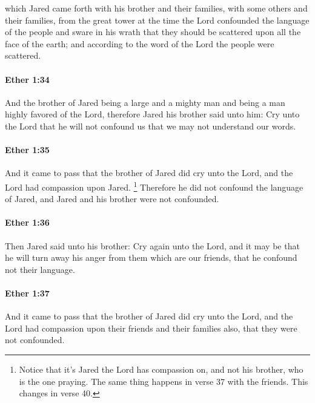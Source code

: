 			which Jared came forth
			with his brother and their families,
			with some others and their families,
			from the great tower
			at the time the Lord confounded the language of the people
			and sware in his wrath
			that they should be scattered upon all the face of the earth;
			and according to the word of the Lord the people were scattered.

		\paragraph{Ether 1:34} %
			\label{ETHER-1-34}

			And the brother of Jared being a large and a mighty man
			and being a man highly favored of the Lord,
			therefore Jared his brother said unto him:
			Cry unto the Lord
			that he will not confound us that we may not understand our words.

		\paragraph{Ether 1:35} %
			\label{ETHER-1-35}

			And it came to pass that the brother of Jared did cry unto the Lord,
			and the Lord had compassion upon Jared.%
				\footnote{%
					Notice that it's Jared the Lord has compassion on, and not his brother, who is the one praying. The same thing happens in verse 37 with the friends. This changes in verse 40.
					}
			Therefore he did not confound the language of Jared,
			and Jared and his brother were not confounded.

		\paragraph{Ether 1:36} %
			\label{ETHER-1-36}

			Then Jared said unto his brother:
			Cry again unto the Lord,
			and it may be that he will turn away his anger from them which are our friends,
			that he confound not their language.

		\paragraph{Ether 1:37} %
			\label{ETHER-1-37}

			And it came to pass that the brother of Jared did cry unto the Lord,
			and the Lord had compassion upon their friends and their families also,
			that they were not confounded.

